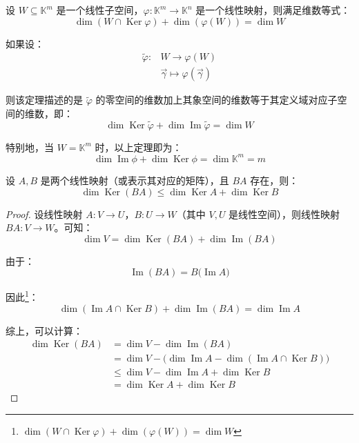 \begin{theorem}
	设 $W \subseteq \mathbb K^m$ 是一个线性子空间，$\varphi \colon \mathbb K^m \to \mathbb K^n$ 是一个线性映射，则满足维数等式：
	$$
	\dim (W \cap \operatorname{Ker} \varphi) + \dim (\varphi(W)) = \dim W
	$$

	如果设：
	$$
	\begin{aligned} \tilde \varphi \colon & W \to \varphi(W) \\ & \vec \gamma \mapsto \varphi(\vec \gamma) \end{aligned}
	$$

	则该定理描述的是 $\tilde \varphi$ 的零空间的维数加上其象空间的维数等于其定义域对应子空间的维数，即：
	$$
	\dim \operatorname{Ker} \tilde \varphi + \dim \operatorname{Im} \tilde \varphi = \dim W
	$$
\end{theorem}

特别地，当 $W = \mathbb K^m$ 时，以上定理即为：
$$
\dim \operatorname{Im} \phi + \dim \operatorname{Ker} \phi = \dim \mathbb K^m = m
$$


\begin{theorem}
	设 $A, B$ 是两个线性映射（或表示其对应的矩阵），且 $BA$ 存在，则：
	$$
	\dim \operatorname{Ker}(BA) \le \dim \operatorname{Ker} A + \dim \operatorname{Ker} B
	$$
\end{theorem}

\begin{proof}
	设线性映射 $A \colon V \to U$，$B \colon U \to W$（其中 $V, U$ 是线性空间），则线性映射 $BA \colon V \to W$。可知：
	$$
	\dim V = \dim \operatorname{Ker}(BA) + \dim \operatorname{Im}(BA)
	$$

	由于：
	$$
	\operatorname{Im} (BA) = B \bigl( \operatorname{Im} A \bigr)
	$$

	因此\footnote{$\dim (W \cap \operatorname{Ker} \varphi) + \dim (\varphi(W)) = \dim W$}：
	$$
	\dim (\operatorname{Im} A \cap \operatorname{Ker} B) + \dim \operatorname{Im}(BA) = \dim \operatorname{Im} A
	$$

	综上，可以计算：
	$$
	\begin{aligned}
		\dim \operatorname{Ker}(BA) &= \dim V - \dim \operatorname{Im}(BA)
		\\&=
		\dim V - \bigl( \dim \operatorname{Im} A - \dim (\operatorname{Im} A \cap \operatorname{Ker} B) \bigr)
		\\&\le
		\dim V - \dim \operatorname{Im} A + \dim \operatorname{Ker} B
		\\&=
		\dim \operatorname{Ker} A + \dim \operatorname{Ker} B
	\end{aligned}
	$$
\end{proof}

